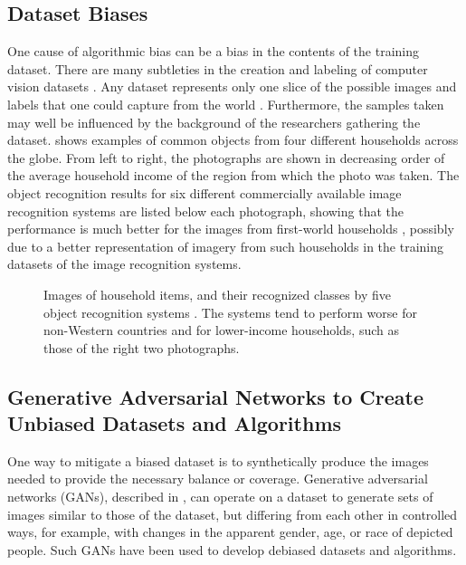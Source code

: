 

\subsection{Dataset Biases}

One cause of algorithmic bias can be a bias in the contents of the training dataset.
There are many subtleties in the creation and labeling of computer vision datasets \cite{Ramaswamy2021b}.
Any dataset represents only one slice of the possible images and labels that one could capture from the world \cite{Torralba2011}.
Furthermore, the samples taken may well be influenced by the background of the researchers gathering the dataset.
\Fig{\ref{fig:soap}} shows examples of common objects from four different households across the globe.  From left to right, the photographs are shown in decreasing order of the average household income of the region from which the photo was taken.  The object recognition results for six different commercially available image recognition systems are listed below each photograph, showing that the performance is much better for the images from first-world households \cite{DeVries2019},  possibly due to a better representation of imagery from such households in the training datasets of the image recognition systems.

\begin{figure}[t]
  \centerline{
    }
  \caption{Images of household items, and their recognized classes by five object recognition systems \cite{DeVries2019}. The systems tend to perform worse for non-Western countries and for lower-income households, such as those of the right two photographs.}
  \label{fig:soap}
\end{figure}



\subsection{Generative Adversarial Networks to Create Unbiased Datasets and Algorithms}

One way to mitigate a biased dataset is to synthetically produce the images needed to provide the necessary balance or coverage.
Generative adversarial networks (GANs), described in \chap{\ref{chapter:generative_models}}, can operate on a dataset  to generate sets of images similar to those of the dataset, but differing from each other in controlled ways, for example, with changes in the apparent gender, age, or race of depicted people.  Such GANs  have been used to develop debiased datasets and algorithms.

